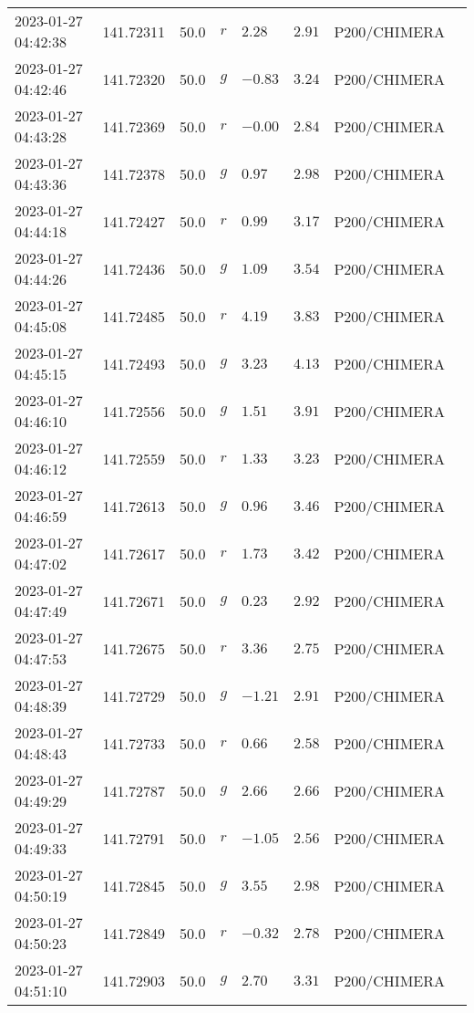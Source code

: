 \documentclass{nature_plusfigure}
\begin{document}
\begin{supplement}
\begin{center}
\begin{longtable}{llllllll}
2023-01-27 04:42:38 & 141.72311 & 50.0 & $r$ & $2.28$ & $2.91$ & P200/CHIMERA &  \\ 
2023-01-27 04:42:46 & 141.72320 & 50.0 & $g$ & $-0.83$ & $3.24$ & P200/CHIMERA &  \\ 
2023-01-27 04:43:28 & 141.72369 & 50.0 & $r$ & $-0.00$ & $2.84$ & P200/CHIMERA &  \\ 
2023-01-27 04:43:36 & 141.72378 & 50.0 & $g$ & $0.97$ & $2.98$ & P200/CHIMERA &  \\ 
2023-01-27 04:44:18 & 141.72427 & 50.0 & $r$ & $0.99$ & $3.17$ & P200/CHIMERA &  \\ 
2023-01-27 04:44:26 & 141.72436 & 50.0 & $g$ & $1.09$ & $3.54$ & P200/CHIMERA &  \\ 
2023-01-27 04:45:08 & 141.72485 & 50.0 & $r$ & $4.19$ & $3.83$ & P200/CHIMERA &  \\ 
2023-01-27 04:45:15 & 141.72493 & 50.0 & $g$ & $3.23$ & $4.13$ & P200/CHIMERA &  \\ 
2023-01-27 04:46:10 & 141.72556 & 50.0 & $g$ & $1.51$ & $3.91$ & P200/CHIMERA &  \\ 
2023-01-27 04:46:12 & 141.72559 & 50.0 & $r$ & $1.33$ & $3.23$ & P200/CHIMERA &  \\ 
2023-01-27 04:46:59 & 141.72613 & 50.0 & $g$ & $0.96$ & $3.46$ & P200/CHIMERA &  \\ 
2023-01-27 04:47:02 & 141.72617 & 50.0 & $r$ & $1.73$ & $3.42$ & P200/CHIMERA &  \\ 
2023-01-27 04:47:49 & 141.72671 & 50.0 & $g$ & $0.23$ & $2.92$ & P200/CHIMERA &  \\ 
2023-01-27 04:47:53 & 141.72675 & 50.0 & $r$ & $3.36$ & $2.75$ & P200/CHIMERA &  \\ 
2023-01-27 04:48:39 & 141.72729 & 50.0 & $g$ & $-1.21$ & $2.91$ & P200/CHIMERA &  \\ 
2023-01-27 04:48:43 & 141.72733 & 50.0 & $r$ & $0.66$ & $2.58$ & P200/CHIMERA &  \\ 
2023-01-27 04:49:29 & 141.72787 & 50.0 & $g$ & $2.66$ & $2.66$ & P200/CHIMERA &  \\ 
2023-01-27 04:49:33 & 141.72791 & 50.0 & $r$ & $-1.05$ & $2.56$ & P200/CHIMERA &  \\ 
2023-01-27 04:50:19 & 141.72845 & 50.0 & $g$ & $3.55$ & $2.98$ & P200/CHIMERA &  \\ 
2023-01-27 04:50:23 & 141.72849 & 50.0 & $r$ & $-0.32$ & $2.78$ & P200/CHIMERA &  \\ 
2023-01-27 04:51:10 & 141.72903 & 50.0 & $g$ & $2.70$ & $3.31$ & P200/CHIMERA &  \\ 

\end{longtable}
\end{center}
\end{supplement}
\end{document}
